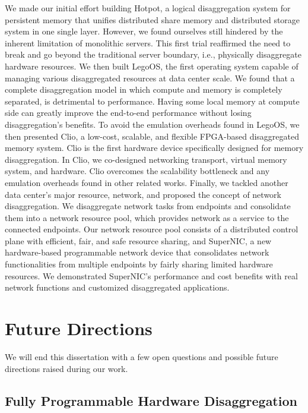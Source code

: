 We made our initial effort building Hotpot, a logical disaggregation system for persistent memory
that unifies distributed share memory and distributed storage system in one single layer.
However, we found ourselves still hindered by the inherent limitation of monolithic servers.
This first trial reaffirmed the need to break and go beyond the traditional server boundary,
i.e., physically disaggregate hardware resources.
We then built LegoOS, the first operating system capable of
managing various disaggregated resources at data center scale.
We found that a complete disaggregation model in which compute and memory is completely separated,
is detrimental to performance.
Having some local memory at compute side can greatly improve the end-to-end performance without losing disaggregation's benefits.
To avoid the emulation overheads found in LegoOS,
we then presented Clio, a low-cost, scalable, and flexible FPGA-based disaggregated memory system.
Clio is the first hardware device specifically designed for memory disaggregation.
In Clio, we co-designed networking transport, virtual memory system, and hardware.
Clio overcomes the scalability bottleneck and any emulation overheads found in other related works.
Finally, we tackled another data center's major resource, network, and proposed the concept of network disaggregation.
We disaggregate network tasks from endpoints and consolidate them into a network resource pool,
which provides network as a service to the connected endpoints.
Our network resource pool consists of a distributed control plane 
with efficient, fair, and safe resource sharing,
and SuperNIC, a new hardware-based programmable network device 
that consolidates network functionalities from multiple
endpoints by fairly sharing limited hardware resources.
We demonstrated SuperNIC's performance and cost benefits with
real network functions and customized disaggregated applications.

\section{Future Directions}

We will end this dissertation with a few open questions and possible
future directions raised during our work.

\subsection{Fully Programmable Hardware Disaggregation}

